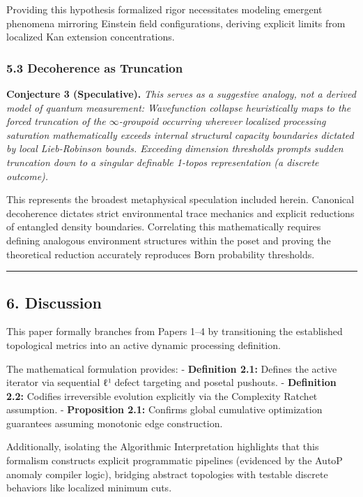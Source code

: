 \documentclass[
]{article}
\begin{document}
Providing this hypothesis formalized rigor necessitates modeling
emergent phenomena mirroring Einstein field configurations, deriving
explicit limits from localized Kan extension concentrations.

\subsubsection{5.3 Decoherence as
Truncation}\label{decoherence-as-truncation}

\textbf{Conjecture 3 (Speculative).} \emph{This serves as a suggestive
analogy, not a derived model of quantum measurement: Wavefunction
collapse heuristically maps to the forced truncation of the
\(\infty\)-groupoid occurring wherever localized processing saturation
mathematically exceeds internal structural capacity boundaries dictated
by local Lieb-Robinson bounds. Exceeding dimension thresholds prompts
sudden truncation down to a singular definable 1-topos representation (a
discrete outcome).}

This represents the broadest metaphysical speculation included herein.
Canonical decoherence dictates strict environmental trace mechanics and
explicit reductions of entangled density boundaries. Correlating this
mathematically requires defining analogous environment structures within
the poset and proving the theoretical reduction accurately reproduces
Born probability thresholds.

\begin{center}\rule{0.5\linewidth}{0.5pt}\end{center}

\subsection{6. Discussion}\label{discussion}

This paper formally branches from Papers 1--4 by transitioning the
established topological metrics into an active dynamic processing
definition.

The mathematical formulation provides: - \textbf{Definition 2.1:}
Defines the active iterator via sequential ℓ¹ defect targeting and
posetal pushouts. - \textbf{Definition 2.2:} Codifies irreversible
evolution explicitly via the Complexity Ratchet assumption. -
\textbf{Proposition 2.1:} Confirms global cumulative optimization
guarantees assuming monotonic edge construction.

Additionally, isolating the Algorithmic Interpretation highlights that
this formalism constructs explicit programmatic pipelines (evidenced by
the AutoP anomaly compiler logic), bridging abstract topologies with
testable discrete behaviors like localized minimum cuts.
\end{document}
